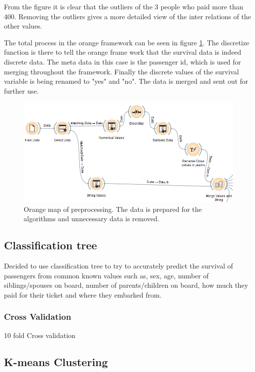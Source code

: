 \documentclass[a4paper,11pt]{article}
\begin{document}
From the figure it is clear that the outliers of the 3 people who paid more than 400. Removing the outliers gives a more detailed view of the inter relations of the other values.

The total process in the orange framework can be seen in figure \ref{preprocessMap}. The discretize function is there to tell the orange frame work that the survival data is indeed discrete data. The meta data in this case is the passenger id, which is used for merging throughout the framework. Finally the discrete values of the survival variable is being renamed to "yes" and "no". The data is merged and sent out for further use.

\begin{figure}
	\begin{center}
	\includegraphics[scale=0.7]{PreprocessMap}
	\end{center}
	\caption{Orange map of preprocessing. The data is prepared for the algorithms and unnecessary data is removed.}
	\label{preprocessMap}
\end{figure}

\subsection{Classification tree}
Decided to use classification tree to try to accurately predict the survival of passengers from common known values such as, sex, age, number of siblings/spouses on board, number of parents/children on board, how much they paid for their ticket and where they embarked from.
\subsubsection{Cross Validation}
10 fold Cross validation
\subsection{K-means Clustering}
\end{document}
